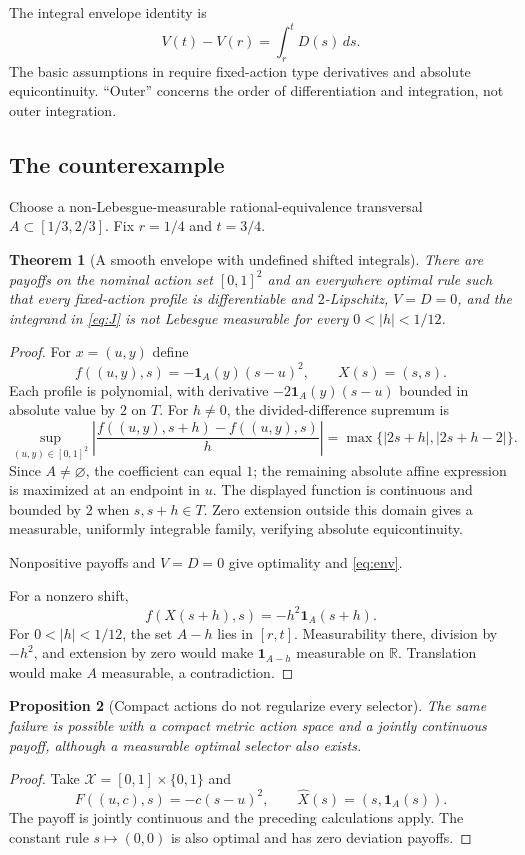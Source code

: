 \documentclass[11pt]{article}
\newtheorem{theorem}{Theorem}
\newtheorem{proposition}[theorem]{Proposition}
\theoremstyle{remark}\newtheorem{remark}[theorem]{Remark}
\newcommand{\R}{\mathbb R}
\newcommand{\ind}{\mathbf 1}
\newcommand{\X}{\mathcal X}
\begin{document}
The integral envelope identity is
\begin{equation}\label{eq:env}
 V(t)-V(r)=\int_r^t D(s)\,ds.
\end{equation}
The basic assumptions in \citet[Sections 2--3]{Sinander2022} require fixed-action type derivatives and absolute equicontinuity. ``Outer'' concerns the order of differentiation and integration, not outer integration.

\subsection{The counterexample}
Choose a non-Lebesgue-measurable rational-equivalence transversal $A\subset[1/3,2/3]$. Fix $r=1/4$ and $t=3/4$.

\begin{theorem}[A smooth envelope with undefined shifted integrals]\label{thm:counter}
There are payoffs on the nominal action set $[0,1]^2$ and an everywhere optimal rule such that every fixed-action profile is differentiable and $2$-Lipschitz, $V=D=0$, and the integrand in \eqref{eq:J} is not Lebesgue measurable for every $0<|h|<1/12$.
\end{theorem}
\begin{proof}
For $x=(u,y)$ define
\[
 f((u,y),s)=-\ind_A(y)(s-u)^2,\qquad X(s)=(s,s).
\]
Each profile is polynomial, with derivative $-2\ind_A(y)(s-u)$ bounded in absolute value by $2$ on $T$. For $h\ne0$, the divided-difference supremum is
\[
 \sup_{(u,y)\in[0,1]^2}\left|\frac{f((u,y),s+h)-f((u,y),s)}h\right|
 =\max\{|2s+h|,|2s+h-2|\}.
\]
Since $A\ne\varnothing$, the coefficient can equal $1$; the remaining absolute affine expression is maximized at an endpoint in $u$. The displayed function is continuous and bounded by $2$ when $s,s+h\in T$. Zero extension outside this domain gives a measurable, uniformly integrable family, verifying absolute equicontinuity.

Nonpositive payoffs and $V=D=0$ give optimality and \eqref{eq:env}.

For a nonzero shift,
\[
 f(X(s+h),s)=-h^2\ind_A(s+h).
\]
For $0<|h|<1/12$, the set $A-h$ lies in $[r,t]$. Measurability there, division by $-h^2$, and extension by zero would make $\ind_{A-h}$ measurable on $\R$. Translation would make $A$ measurable, a contradiction.
\end{proof}

\begin{proposition}[Compact actions do not regularize every selector]\label{prop:compactexample}
The same failure is possible with a compact metric action space and a jointly continuous payoff, although a measurable optimal selector also exists.
\end{proposition}
\begin{proof}
Take $\X=[0,1]\times\{0,1\}$ and
\[
 F((u,c),s)=-c(s-u)^2,\qquad \widehat X(s)=(s,\ind_A(s)).
\]
The payoff is jointly continuous and the preceding calculations apply. The constant rule $s\mapsto(0,0)$ is also optimal and has zero deviation payoffs.
\end{proof}
\end{document}
